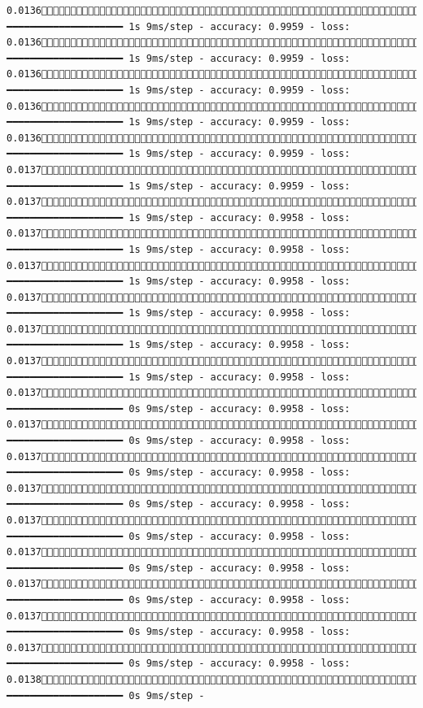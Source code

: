 \documentclass[
  letterpaper,
  DIV=11,
  numbers=noendperiod]{scrreprt}
\begin{document}
\begin{verbatim}
0.01361687/1875 ━━━━━━━━━━━━━━━━━━━━ 1s 9ms/step - accuracy: 0.9959 - loss: 0.01361693/1875 ━━━━━━━━━━━━━━━━━━━━ 1s 9ms/step - accuracy: 0.9959 - loss: 0.01361700/1875 ━━━━━━━━━━━━━━━━━━━━ 1s 9ms/step - accuracy: 0.9959 - loss: 0.01361707/1875 ━━━━━━━━━━━━━━━━━━━━ 1s 9ms/step - accuracy: 0.9959 - loss: 0.01361714/1875 ━━━━━━━━━━━━━━━━━━━━ 1s 9ms/step - accuracy: 0.9959 - loss: 0.01371720/1875 ━━━━━━━━━━━━━━━━━━━━ 1s 9ms/step - accuracy: 0.9959 - loss: 0.01371726/1875 ━━━━━━━━━━━━━━━━━━━━ 1s 9ms/step - accuracy: 0.9958 - loss: 0.01371732/1875 ━━━━━━━━━━━━━━━━━━━━ 1s 9ms/step - accuracy: 0.9958 - loss: 0.01371738/1875 ━━━━━━━━━━━━━━━━━━━━ 1s 9ms/step - accuracy: 0.9958 - loss: 0.01371744/1875 ━━━━━━━━━━━━━━━━━━━━ 1s 9ms/step - accuracy: 0.9958 - loss: 0.01371751/1875 ━━━━━━━━━━━━━━━━━━━━ 1s 9ms/step - accuracy: 0.9958 - loss: 0.01371757/1875 ━━━━━━━━━━━━━━━━━━━━ 1s 9ms/step - accuracy: 0.9958 - loss: 0.01371765/1875 ━━━━━━━━━━━━━━━━━━━━ 0s 9ms/step - accuracy: 0.9958 - loss: 0.01371772/1875 ━━━━━━━━━━━━━━━━━━━━ 0s 9ms/step - accuracy: 0.9958 - loss: 0.01371778/1875 ━━━━━━━━━━━━━━━━━━━━ 0s 9ms/step - accuracy: 0.9958 - loss: 0.01371785/1875 ━━━━━━━━━━━━━━━━━━━━ 0s 9ms/step - accuracy: 0.9958 - loss: 0.01371791/1875 ━━━━━━━━━━━━━━━━━━━━ 0s 9ms/step - accuracy: 0.9958 - loss: 0.01371798/1875 ━━━━━━━━━━━━━━━━━━━━ 0s 9ms/step - accuracy: 0.9958 - loss: 0.01371805/1875 ━━━━━━━━━━━━━━━━━━━━ 0s 9ms/step - accuracy: 0.9958 - loss: 0.01371812/1875 ━━━━━━━━━━━━━━━━━━━━ 0s 9ms/step - accuracy: 0.9958 - loss: 0.01371819/1875 ━━━━━━━━━━━━━━━━━━━━ 0s 9ms/step - accuracy: 0.9958 - loss: 0.01381826/1875 ━━━━━━━━━━━━━━━━━━━━ 0s 9ms/step - 
\end{verbatim}
\end{document}
